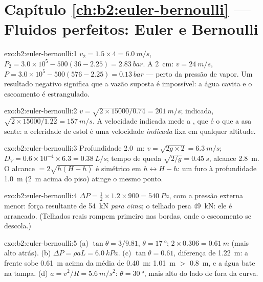 \section*{Capítulo \ref{ch:b2:euler-bernoulli} --- Fluidos perfeitos: Euler e Bernoulli}

\begin{solution}{exo:b2:euler-bernoulli:1}
$v_2 = 1.5 \times 4 = \qty{6.0}{m/s}$, $P_2 = 3.0 \times 10^5 - 500(36 - 2.25) =
\qty{2.83}{bar}$. A \qty{2}{cm}: $v = \qty{24}{m/s}$, $P = 3.0 \times 10^5 - 500
(576 - 2.25) = \qty{0.13}{bar}$ --- perto da pressão de vapor. Um resultado
negativo significa que a vazão suposta é impossível: a água cavita
e o escoamento é estrangulado.
\end{solution}

\begin{solution}{exo:b2:euler-bernoulli:2}
$v = \sqrt{2 \times 15000/0.74} = \qty{201}{m/s}$; indicada, $\sqrt{2 \times 15000/
1.22} = \qty{157}{m/s}$. A velocidade indicada mede a ,
que é o que a asa sente: a celeridade de estol é uma velocidade
\emph{indicada} fixa em qualquer altitude.
\end{solution}

\begin{solution}{exo:b2:euler-bernoulli:3}
Profundidade \qty{2.0}{m}: $v = \sqrt{2g \times 2} = \qty{6.3}{m/s}$; $D_V = 0.6 \times 10^{-4}
\times 6.3 = \qty{0.38}{L/s}$; tempo de queda $\sqrt{2/g} = \qty{0.45}{s}$, alcance
\qty{2.8}{m}. O alcance $= 2\sqrt{h(H - h)}$ é simétrico em $h \leftrightarrow H -
h$: um furo à profundidade \qty{1.0}{m} (\qty{2}{m} acima do piso) atinge o mesmo
ponto.
\end{solution}

\begin{solution}{exo:b2:euler-bernoulli:4}
$\Delta P = \tfrac12 \times 1.2 \times 900 = \qty{540}{Pa}$, com a pressão externa menor:
força resultante de \qty{54}{kN} \emph{para cima}; o telhado pesa \qty{49}{kN}: ele é
arrancado. (Telhados reais rompem primeiro nas bordas, onde o escoamento se descola.)
\end{solution}

\begin{solution}{exo:b2:euler-bernoulli:5}
(a) $\tan\theta = 3/9.81$, $\theta = \qty{17}{\degree}$; $2 \times 0.306 = \qty{0.61}{m}$
(mais alto atrás). (b) $\Delta P = \rho aL = \qty{6.0}{kPa}$. (c) $\tan\theta =
0.61$, diferença de \qty{1.22}{m}: a frente sobe \qty{0.61}{m} acima da média de
\qty{0.40}{m}: \qty{1.01}{m} $>$ \qty{0.8}{m}, e a água bate na tampa. (d) $a = v^2/R =
\qty{5.6}{m/s^2}$: $\theta = \qty{30}{\degree}$, mais alto do lado de fora da curva.
\end{solution}

